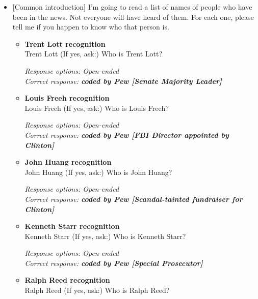 \documentclass[12pt, letterpaper]{article}
\begin{document}
\begin{itemize}
\item {[Common introduction] I'm going to read a list of names of people who have been in the news. Not everyone will have heard of them. For each one, please tell me if you happen to know who that person is. 

   \begin{itemize}
\item \textbf{Trent Lott recognition} \\
Trent Lott (If yes, ask:) Who is Trent Lott?

\textit{Response options: Open-ended} \\
\textit{Correct response: \textbf{coded by Pew [Senate Majority Leader]}}
\end{itemize}

   \begin{itemize}
\item \textbf{Louis Freeh recognition} \\
Louis Freeh (If yes, ask:) Who is Louis Freeh?

\textit{Response options: Open-ended} \\
\textit{Correct response: \textbf{coded by Pew [FBI Director appointed by Clinton]}}
\end{itemize}

   \begin{itemize}
\item \textbf{John Huang recognition} \\
John Huang (If yes, ask:) Who is John Huang?

\textit{Response options: Open-ended} \\
\textit{Correct response: \textbf{coded by Pew [Scandal-tainted fundraiser for Clinton]}}
\end{itemize}

   \begin{itemize}
\item \textbf{Kenneth Starr recognition} \\
Kenneth Starr (If yes, ask:) Who is Kenneth Starr?

\textit{Response options: Open-ended} \\
\textit{Correct response: \textbf{coded by Pew [Special Prosecutor]}}
\end{itemize}

   \begin{itemize}
\item \textbf{Ralph Reed recognition} \\
Ralph Reed (If yes, ask:) Who is Ralph Reed?


\end{itemize}}
\end{itemize}
\end{document}
